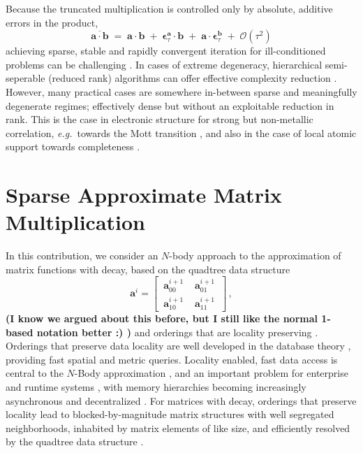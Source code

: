 \documentclass[letterpaper,twocolumn,amsmath,amsfont,amssymb,english,aps,jcp,preprintnumbers,groupaddress,nofootinbib,tightenlines]{revtex4}
\newcommand{\mat}[1]{\boldsymbol{#1}}
\begin{document}
Because the truncated multiplication is controlled only by absolute,
additive errors in the product,
\begin{equation} \label{sparseapprox}
\overline{ \mat{a} \cdot \mat{b} }\; = \; \mat{a}\cdot\mat{b} \; +\; \mat{\epsilon}^{\mat{a}}_\tau \cdot \mat{b} \;+\;
 \mat{a} \cdot \mat{\epsilon}^{\mat{b}}_\tau  \; + \;   {\mathcal O}(\tau^2)
\end{equation}
achieving sparse, stable and rapidly convergent iteration for
ill-conditioned problems can be challenging \cite{}.  In cases of
extreme degeneracy, hierarchical semi-seperable (reduced rank)
algorithms can offer effective complexity reduction \cite{}.  However,
many practical cases are somewhere in-between sparse and meaningfully
degenerate regimes; effectively dense but without an exploitable
reduction in rank.  This is the case in electronic structure for
strong but non-metallic correlation, {\em e.g.}~towards the Mott
transition \cite{}, and also in the case of local atomic support
towards completeness \cite{Others, Hutter, Gigi}.

\pagebreak

\section{Sparse Approximate Matrix Multiplication}

In this contribution, we consider an $N$-body approach to the
approximation of matrix functions with decay, based on the quadtree
data structure \cite{wise, samet}
\begin{equation}
\mat{a}^i = \begin{bmatrix} \,  \mat{a}^{i+1}_{00} \, & \,  \mat{a}^{i+1}_{01} \,  \\[0.2cm]  \, \mat{a}^{i+1}_{10} \,  & \,\mat{a}^{i+1}_{11} \, \end{bmatrix} \, ,
\end{equation}
{\bf (I know we argued about this before, but I still like the normal 1-based notation better :) )}
and orderings that are locality preserving \cite{}.  Orderings that
preserve data locality are well developed in the database theory
\cite{}, providing fast spatial and metric queries.  Locality
enabled, fast data access is central to the $N$-Body approximation
\cite{}, and an important problem for enterprise \cite{} and runtime
systems \cite{}, with memory hierarchies becoming increasingly
asynchronous and decentralized \cite{cache}.  For matrices with
decay, orderings that preserve locality lead to blocked-by-magnitude
matrix structures with well segregated neighborhoods, inhabited by
matrix elements of like size, and efficiently resolved by the quadtree
data structure \cite{}.
\end{document}
